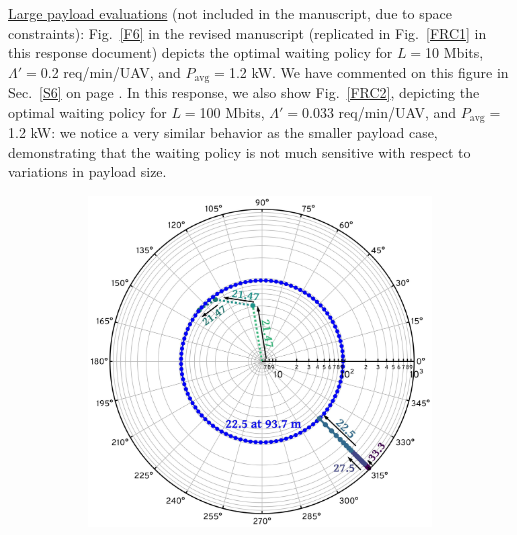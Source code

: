 \documentclass[12pt, draftcls, onecolumn]{IEEEtran}
\theoremstyle{plain}
\theoremstyle{definition}
\theoremstyle{remark}
\begin{document}
\begin{enumerate}
    
\underline{Large payload evaluations} (not included in the manuscript, due to space constraints):
Fig.~\ref{F6} in the revised manuscript (replicated in Fig.~\ref{FRC1} in this response document) depicts the optimal waiting policy for $L{=}$10 Mbits, $\Lambda'{=}$0.2 req/min/UAV, and $P_{\mathrm{avg}}{=}$1.2 kW. We have commented on this figure in Sec.~\ref{S6} on page \pageref{F6}.
 In this response, we also show
 Fig.~\ref{FRC2}, depicting the optimal waiting policy for $L{=}$100 Mbits, $\Lambda'{=}$0.033 req/min/UAV, and $P_{\mathrm{avg}}{=}$1.2 kW: 
 we notice a very similar behavior as the smaller payload case, demonstrating that the waiting policy is not much sensitive with respect to variations in payload size.
    \begin{figure} [t]
        \begin{subfigure}{0.5\linewidth}
          \centering
          \includegraphics[width=1.0\linewidth]{figs/Waiting_Policy_10Mb.jpeg}

\end{subfigure}
\end{figure}
\end{enumerate}
\end{document}
